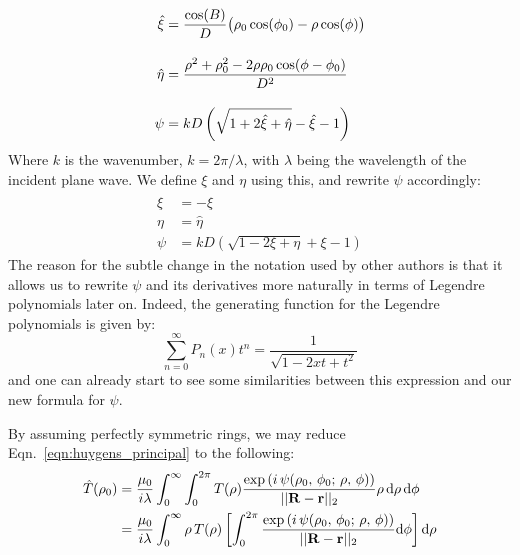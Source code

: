 \documentclass{article}
\begin{document}
        \begin{align}
            \hat{\xi}
            &=\frac{\cos(B)}{D}\big(
                \rho_{0}\cos(\phi_{0})-\rho\cos(\phi)
            \big)\\[1em]
            \hat{\eta}
            &=\frac{%
                \rho^{2}+\rho_{0}^{2}-2\rho\rho_{0}\cos(\phi-\phi_{0})%
            }{D^{2}}\\[1em]
            \psi
            &=kD\left(
                \sqrt{1+2\hat{\xi}+\hat{\eta}}-\hat{\xi}-1
            \right)
        \end{align}
        Where $k$ is the wavenumber, $k=2\pi/\lambda$, with $\lambda$ being
        the wavelength of the incident plane wave.
        We define $\xi$ and $\eta$ using this, and rewrite $\psi$ accordingly:
        \begin{align}
            \xi&=-\hat{\xi}\\
            \eta&=\hat{\eta}\\
            \psi&=kD\left(
                \sqrt{1-2\xi+\eta}+\xi-1
            \right)
        \end{align}
        The reason for the subtle change in the notation used by other
        authors is that it allows us to rewrite $\psi$ and its derivatives
        more naturally in terms of Legendre polynomials later on. Indeed,
        the generating function for the Legendre polynomials is given by:
        \begin{equation}
            \sum_{n=0}^{\infty}P_{n}(x)t^{n}
            =\frac{1}{\sqrt{1-2xt+t^{2}}}
        \end{equation}
        and one can already start to see some similarities between this
        expression and our new formula for $\psi$.
        \par\hfill\par
        By assuming perfectly symmetric rings, we may reduce
        Eqn.~\ref{eqn:huygens_principal} to the following:
        \begin{subequations}
            \begin{align}
                \hat{T}(\rho_{0})
                &=\frac{\mu_{0}}{i\lambda}\int_{0}^{\infty}\int_{0}^{2\pi}
                    T(\rho)
                    \frac{%
                        \exp\left(
                            i\,\psi(\rho_{0},\,\phi_{0};\,\rho,\,\phi)
                        \right)
                    }{%
                        ||\mathbf{R}-\mathbf{r}||_{2}
                    }
                    \rho\,\textrm{d}\rho\,\textrm{d}\phi\\
                &=\frac{\mu_{0}}{i\lambda}\int_{0}^{\infty}
                    \rho\,T(\rho)\left[
                        \int_{0}^{2\pi}
                        \frac{%
                            \exp\left(
                                i\,\psi(\rho_{0},\,\phi_{0};\,\rho,\,\phi)
                            \right)
                        }{%
                            ||\mathbf{R}-\mathbf{r}||_{2}
                        }
                        \textrm{d}\phi
                    \right]
                    \textrm{d}\rho
                \end{align}
        \end{subequations}
\end{document}
